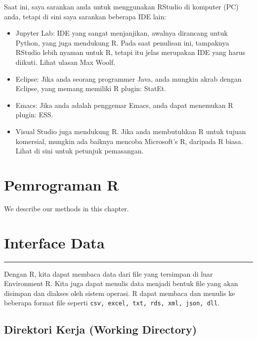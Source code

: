 \documentclass[
]{book}
\providecommand{\tightlist}{%
  \setlength{\itemsep}{0pt}\setlength{\parskip}{0pt}}
\begin{document}
Saat ini, saya sarankan anda untuk menggunakan RStudio di komputer (PC) anda, tetapi di sini saya sarankan beberapa IDE lain:

\begin{itemize}
\tightlist
\item
  Jupyter Lab: IDE yang sangat menjanjikan, awalnya dirancang untuk Python, yang juga mendukung R. Pada saat penulisan ini, tampaknya RStudio lebih nyaman untuk R, tetapi itu jelas merupakan IDE yang harus diikuti. Lihat ulasan Max Woolf.
\item
  Eclipse: Jika anda seorang programmer Java, anda mungkin akrab dengan Eclipse, yang memang memiliki R plugin: StatEt.
\item
  Emacs: Jika anda adalah penggemar Emacs, anda dapat menemukan R plugin: ESS.
\item
  Visual Studio juga mendukung R. Jika anda membutuhkan R untuk tujuan komersial, mungkin ada baiknya mencoba Microsoft's R, daripada R biasa. Lihat di sini untuk petunjuk pemasangan.
\end{itemize}

\hypertarget{Pemrograman-R}{%
\chapter{Pemrograman R}\label{Pemrograman-R}}

We describe our methods in this chapter.

\hypertarget{Interface-Data}{%
\chapter{Interface Data}\label{Interface-Data}}

\begin{center}\rule{0.5\linewidth}{0.5pt}\end{center}

Dengan R, kita dapat membaca data dari file yang tersimpan di luar Environment R. Kita juga dapat menulis data menjadi bentuk file yang akan disimpan dan diakses oleh sistem operasi. R dapat membaca dan menulis ke beberapa format file seperti \texttt{csv,\ excel,\ txt,\ rds,\ xml,\ json,\ dll}.

\hypertarget{direktori-kerja-working-directory}{%
\section{Direktori Kerja (Working Directory)}\label{direktori-kerja-working-directory}}
\end{document}
